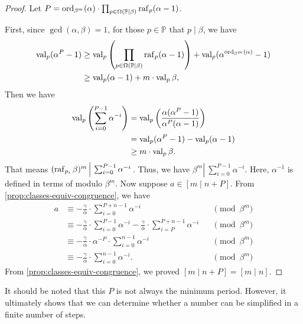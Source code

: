\begin{proof}
    Let $P = \operatorname{ord}_{\beta^{m}}(\alpha) \cdot \prod_{p\in\Omega(\mathbb{P} \mid \beta)}\operatorname{raf}_{p}(\alpha-1)$.

    First, since $\gcd(\alpha, \beta) = 1$, for those $p \in \mathbb{P}$ that $p \mid \beta$, we have
    \begin{align*}
        \operatorname{val}_{p}(\alpha^P - 1) & \ge \operatorname{val}_{p}\left(\prod_{p\in\Omega(\mathbb{P} \mid \beta)}\operatorname{raf}_{p}(\alpha-1)\right) + \operatorname{val}_{p}(\alpha^{\operatorname{ord}_{\beta^{m}}(\alpha)} - 1) \\
                                 & \ge \operatorname{val}_{p}(\alpha-1) + m \cdot \operatorname{val}_{p}\beta,
    \end{align*}
    Then we have
    \begin{align*}
        \operatorname{val}_{p}\left(\sum_{i=0}^{P - 1}\alpha^{-i}\right) & = \operatorname{val}_{p}\left(\frac{\alpha(\alpha^{P} - 1)}{\alpha^{P}(\alpha - 1)}\right) \\
                &= \operatorname{val}_{p}(\alpha^P - 1) - \operatorname{val}_{p}(\alpha-1) \\
                &\ge m \cdot \operatorname{val}_{p}\beta.
    \end{align*}
    That means $(\operatorname{raf}_{p_i}\beta)^{m} \left\vert\ \sum_{i=0}^{P - 1}\alpha^{-i} \right. $.
    Thus, we have $\beta^{m} \left\vert\ \sum_{i=0}^{P - 1}\alpha^{-i} \right. $.
    Here, $\alpha^{-1}$ is defined in terms of modulo $\beta^{m}$. \newline
    Now suppose $a \in [m \mid n + P]$.
    From \cref{prop:classes-equiv-congruence}, we have
    \begin{align*}
        a   &\equiv -\frac{\gamma}{\alpha}\cdot\sum_{i=0}^{P+n-1}\alpha^{-i}    &&\pmod{\beta^{m}} \\
            &\equiv -\frac{\gamma}{\alpha}\cdot\sum_{i=0}^{P - 1}\alpha^{-i} - \frac{\gamma}{\alpha}\cdot\sum_{i=P}^{P + n - 1}\alpha^{-i}    &&\pmod{\beta^{m}} \\
            &\equiv - \frac{\gamma}{\alpha}\cdot\alpha^{-P} \cdot\sum_{i=0}^{n - 1}\alpha^{-i}    &&\pmod{\beta^{m}} \\
            &\equiv -\frac{\gamma}{\alpha}\cdot\sum_{i=0}^{n - 1}\alpha^{-i}.    &&\pmod{\beta^{m}}
    \end{align*}
    From \cref{prop:classes-equiv-congruence}, we proved $[m\mid n + P] = [m\mid n]$.
\end{proof}
\begin{remark}
It should be noted that this $P$ is not always the minimum period. However, it ultimately shows that we can determine whether a number can be simplified in a finite number of steps.
\end{remark}

